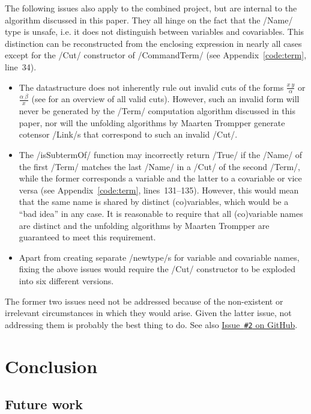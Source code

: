 \documentclass[12pt,a4paper]{article}
\begin{document}
The following issues also apply to the combined project, but are internal to the algorithm discussed in this paper. They all hinge on the fact that the \hs/Name/ type is unsafe, i.e. it does not distinguish between variables and covariables. This distinction can be reconstructed from the enclosing expression in nearly all cases except for the \hs/Cut/ constructor of \hs/CommandTerm/ (see Appendix~\ref{code:term}, line~34).
\begin{itemize}
    \item The datastructure does not inherently rule out invalid cuts of the forms $\frac{x\ y}{\alpha}$ or $\frac{\alpha\ \beta}{x}$ (see \cite[p.~24]{mm12} for an overview of all valid cuts). However, such an invalid form will never be generated by the \hs/Term/ computation algorithm discussed in this paper, nor will the unfolding algorithms by Maarten Trompper generate cotensor \hs/Link/s that correspond to such an invalid \hs/Cut/.
    \item The \hs/isSubtermOf/ function may incorrectly return \hs/True/ if the \hs/Name/ of the first \hs/Term/ matches the last \hs/Name/ in a \hs/Cut/ of the second \hs/Term/, while the former corresponds a variable and the latter to a covariable or vice versa (see Appendix~\ref{code:term}, lines~131--135). However, this would mean that the same name is shared by distinct (co)variables, which would be a ``bad idea'' in any case. It is reasonable to require that all (co)variable names are distinct and the unfolding algorithms by Maarten Trompper are guaranteed to meet this requirement.
    \item Apart from creating separate \hs/newtype/s for variable and covariable names, fixing the above issues would require the \hs/Cut/ constructor to be exploded into six different versions.
\end{itemize}
The former two issues need not be addressed because of the non-existent or irrelevant circumstances in which they would arise. Given the latter issue, not addressing them is probably the best thing to do. See also \href{https://github.com/jgonggrijp/net-prove/issues/2}{Issue~\texttt{\#2} on GitHub}.


\section{Conclusion}

\subsection{Future work}
\end{document}
